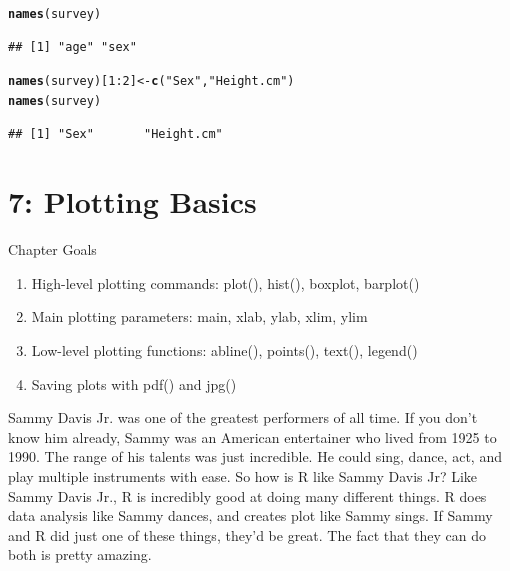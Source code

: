 \documentclass{tufte-book}\usepackage[]{graphicx}\usepackage[]{color}
\makeatletter
\newcommand{\hlnum}[1]{\textcolor[rgb]{0.686,0.059,0.569}{#1}}%
\newcommand{\hlstr}[1]{\textcolor[rgb]{0.192,0.494,0.8}{#1}}%
\newcommand{\hlopt}[1]{\textcolor[rgb]{0,0,0}{#1}}%
\newcommand{\hlstd}[1]{\textcolor[rgb]{0.345,0.345,0.345}{#1}}%
\newcommand{\hlkwb}[1]{\textcolor[rgb]{0.69,0.353,0.396}{#1}}%
\newcommand{\hlkwd}[1]{\textcolor[rgb]{0.737,0.353,0.396}{\textbf{#1}}}%
\newenvironment{kframe}{%
 \def\at@end@of@kframe{}%
 \ifinner\ifhmode%
  \def\at@end@of@kframe{\end{minipage}}%
  \begin{minipage}{\columnwidth}%
 \fi\fi%
 \def\FrameCommand##1{\hskip\@totalleftmargin \hskip-\fboxsep
 \colorbox{shadecolor}{##1}\hskip-\fboxsep
     \hskip-\linewidth \hskip-\@totalleftmargin \hskip\columnwidth}%
 \MakeFramed {\advance\hsize-\width
   \@totalleftmargin\z@ \linewidth\hsize
   \@setminipage}}%
 {\par\unskip\endMakeFramed%
 \at@end@of@kframe}
\newenvironment{knitrout}{}{} %
\makeatother
\begin{document}
\begin{footnotesize}
\begin{itemize}
\begin{footnotesize}
\begin{knitrout}
\color{fgcolor}\begin{kframe}
\begin{alltt}
\hlkwd{names}\hlstd{(survey)}
\end{alltt}
\begin{verbatim}
## [1] "age" "sex"
\end{verbatim}
\begin{alltt}
\hlkwd{names}\hlstd{(survey)[}\hlnum{1}\hlopt{:}\hlnum{2}\hlstd{]} \hlkwb{<-} \hlkwd{c}\hlstd{(}\hlstr{"Sex"}\hlstd{,} \hlstr{"Height.cm"}\hlstd{)}
\hlkwd{names}\hlstd{(survey)}
\end{alltt}
\begin{verbatim}
## [1] "Sex"       "Height.cm"
\end{verbatim}
\end{kframe}
\end{knitrout}
\end{footnotesize}

  
  



\end{itemize}

\chapter{7: Plotting Basics}
\label{ch:7}

Chapter Goals

\begin{enumerate}
  \item High-level plotting commands: plot(), hist(), boxplot, barplot()
  \item Main plotting parameters: main, xlab, ylab, xlim, ylim
  \item Low-level plotting functions: abline(), points(), text(), legend()
  \item Saving plots with pdf() and jpg()
\end{enumerate}

Sammy Davis Jr. was one of the greatest performers of all time. If you don't know him already, Sammy was an American entertainer who lived from 1925 to 1990. The range of his talents was just incredible. He could sing, dance, act, and play multiple instruments with ease. So how is R like Sammy Davis Jr? Like Sammy Davis Jr., R is incredibly good at doing many different things. R does data analysis like Sammy dances, and creates plot like Sammy sings. If Sammy and R did just one of these things, they'd be great. The fact that they can do both is pretty amazing.


\end{footnotesize}
\end{document}
